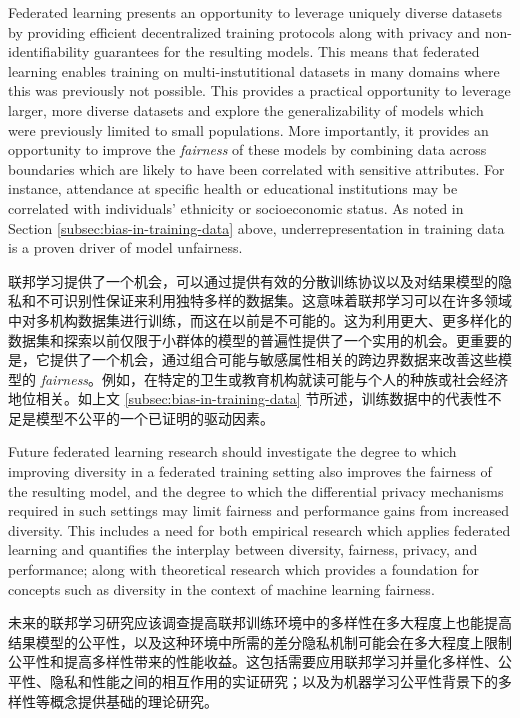 Federated learning presents an opportunity to leverage uniquely diverse datasets by providing efficient decentralized training protocols along with privacy and non-identifiability guarantees for the resulting models. This means that federated learning enables training on multi-instutitional datasets in many domains where this was previously not possible. This provides a practical opportunity to leverage larger, more diverse datasets and explore the generalizability of models which were previously limited to small populations. More importantly, it provides an opportunity to improve the \textit{fairness} of these models by combining data across boundaries which are likely to have been correlated with sensitive attributes. For instance, attendance at specific health or educational institutions may be correlated with individuals' ethnicity or socioeconomic status. As noted in Section \ref{subsec:bias-in-training-data} above, underrepresentation in training data is a proven driver of model unfairness. 

联邦学习提供了一个机会，可以通过提供有效的分散训练协议以及对结果模型的隐私和不可识别性保证来利用独特多样的数据集。这意味着联邦学习可以在许多领域中对多机构数据集进行训练，而这在以前是不可能的。这为利用更大、更多样化的数据集和探索以前仅限于小群体的模型的普遍性提供了一个实用的机会。更重要的是，它提供了一个机会，通过组合可能与敏感属性相关的跨边界数据来改善这些模型的 \textit{fairness}。例如，在特定的卫生或教育机构就读可能与个人的种族或社会经济地位相关。如上文 \ref{subsec:bias-in-training-data} 节所述，训练数据中的代表性不足是模型不公平的一个已证明的驱动因素。

Future federated learning research should investigate the degree to which improving diversity in a federated training setting also improves the fairness of the resulting model, and the degree to which the differential privacy mechanisms required in such settings may limit fairness and performance gains from increased diversity. This includes a need for both empirical research which applies federated learning and quantifies the interplay between diversity, fairness, privacy, and performance; along with theoretical research which provides a foundation for concepts such as diversity in the context of machine learning fairness.

未来的联邦学习研究应该调查提高联邦训练环境中的多样性在多大程度上也能提高结果模型的公平性，以及这种环境中所需的差分隐私机制可能会在多大程度上限制公平性和提高多样性带来的性能收益。这包括需要应用联邦学习并量化多样性、公平性、隐私和性能之间的相互作用的实证研究；以及为机器学习公平性背景下的多样性等概念提供基础的理论研究。



